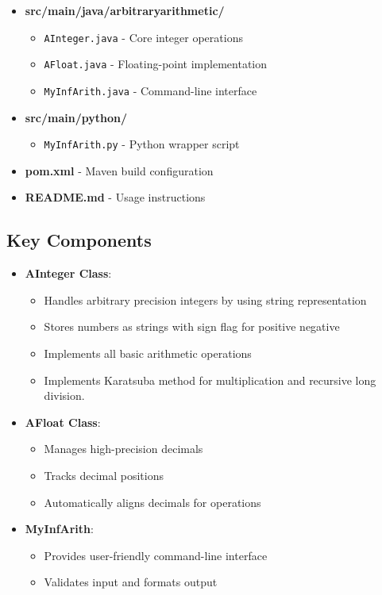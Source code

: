 \documentclass{article}
\begin{document}
\begin{itemize}
    \item \textbf{src/main/java/arbitraryarithmetic/}
    \begin{itemize}
        \item \texttt{AInteger.java} - Core integer operations
        \item \texttt{AFloat.java} - Floating-point implementation
        \item \texttt{MyInfArith.java} - Command-line interface
    \end{itemize}
    
    \item \textbf{src/main/python/}
    \begin{itemize}
        \item \texttt{MyInfArith.py} - Python wrapper script
    \end{itemize}
    
    \item \textbf{pom.xml} - Maven build configuration
    \item \textbf{README.md} - Usage instructions
\end{itemize}

\subsection{Key Components}
\begin{itemize}
    \item \textbf{AInteger Class}:
    \begin{itemize}
        \item Handles arbitrary precision integers by using string representation
        \item Stores numbers as strings with sign flag for positive negative
        \item Implements all basic arithmetic operations
        \item Implements Karatsuba method for multiplication and recursive long division.
    \end{itemize}
    
    \item \textbf{AFloat Class}:
    \begin{itemize}
        \item Manages high-precision decimals
        \item Tracks decimal positions
        \item Automatically aligns decimals for operations
    \end{itemize}
    
    \item \textbf{MyInfArith}:
    \begin{itemize}
        \item Provides user-friendly command-line interface
        \item Validates input and formats output
    \end{itemize}
\end{itemize}
\end{document}

